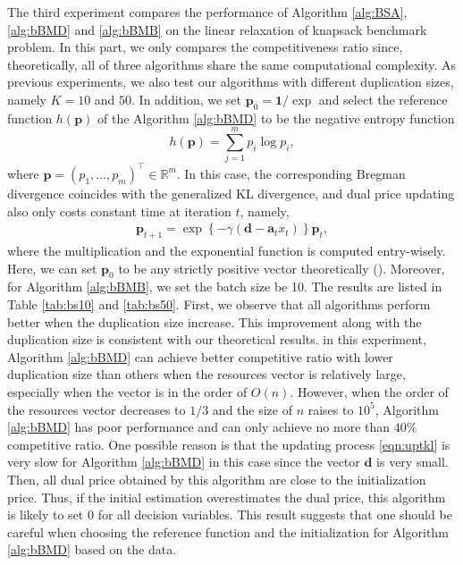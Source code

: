 \documentclass{article} %
\begin{document}
The third experiment compares the performance of Algorithm \ref{alg:BSA}, \ref{alg:bBMD} and \ref{alg:bBMB} on the linear relaxation of knapsack benchmark problem. In this part, we only compares the competitiveness ratio since, theoretically, all of three algorithms share the same computational complexity. As previous experiments, we also test our algorithms with different duplication sizes, namely $K=10$ and $50$. In addition, we set $\bm{p}_0 = \bm{1}/\exp$ and select the reference function $h(\bm{p})$ of the Algorithm \ref{alg:bBMD} to be the negative entropy function
$$
    h(\bm{p})
    =
    \sum\limits_{j=1}^{m}p_i\log p_i,
$$
where $\bm{p}=(p_1,...,p_m)^{\top}\in\mathbb{R}^m$. In this case, the corresponding Bregman divergence coincides with the generalized KL divergence, and dual price updating also only costs constant time at iteration $t$, namely, 
\begin{align}
    \label{eqn:uptkl}
    \bm{p}_{t+1} = \exp\left\{-\gamma(\bm{d}-\bm{a}_{t} x_{t})\right\}\bm{p}_t,    
\end{align}
where the multiplication and the exponential function is computed entry-wisely. Here, we can set $\bm{p}_0$ to be any strictly positive vector theoretically (\cite{balseiro2020best}). Moreover, for Algorithm \ref{alg:bBMB}, we set the batch size be 10. The results are listed in Table \ref{tab:bs10} and \ref{tab:bs50}. First, we observe that all algorithms perform better when the duplication size increase. This improvement along with the duplication size is consistent with our theoretical results. in this experiment, Algorithm \ref{alg:bBMD} can achieve better competitive ratio with lower duplication size than others when the resources vector is relatively large, especially when the vector is in the order of $O(n)$. However, when the order of the resources vector decreases to $1/3$ and the size of $n$ raises to $10^5$, Algorithm \ref{alg:bBMD} has poor performance and can only achieve no more than $40\%$ competitive ratio. One possible reason is that the updating process \eqref{eqn:uptkl} is very slow for Algorithm \ref{alg:bBMD} in this case since the vector $\bm{d}$ is very small. Then, all dual price obtained by this algorithm are close to the initialization price. Thus, if the initial estimation overestimates the dual price, this algorithm is likely to set 0 for all decision variables. This result suggests that one should be careful when choosing the reference function and the initialization for Algorithm \ref{alg:bBMD} based on the data. 
\end{document}
